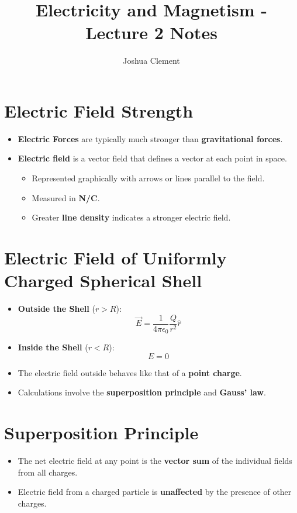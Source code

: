 \documentclass{article}
\begin{document}
\title{Electricity and Magnetism - Lecture 2 Notes}
\author{Joshua Clement}
\maketitle

\section*{Electric Field Strength}
\begin{itemize}
    \item \textbf{Electric Forces} are typically much stronger than \textbf{gravitational forces}.
    \item \textbf{Electric field} is a vector field that defines a vector at each point in space.
    \begin{itemize}
        \item Represented graphically with arrows or lines parallel to the field.
        \item Measured in \textbf{N/C}.
        \item Greater \textbf{line density} indicates a stronger electric field.
    \end{itemize}
\end{itemize}

\section*{Electric Field of Uniformly Charged Spherical Shell}
\begin{itemize}
    \item \textbf{Outside the Shell} (\(r > R\)):
    \[
    \vec{E} = \frac{1}{4\pi\epsilon_0} \frac{Q}{r^2} \hat{r}
    \]
    \item \textbf{Inside the Shell} (\(r < R\)):
    \[
    E = 0
    \]
    \item The electric field outside behaves like that of a \textbf{point charge}.
    \item Calculations involve the \textbf{superposition principle} and \textbf{Gauss' law}.
\end{itemize}

\section*{Superposition Principle}
\begin{itemize}
    \item The net electric field at any point is the \textbf{vector sum} of the individual fields from all charges.
    \item Electric field from a charged particle is \textbf{unaffected} by the presence of other charges.
\end{itemize}
\end{document}
